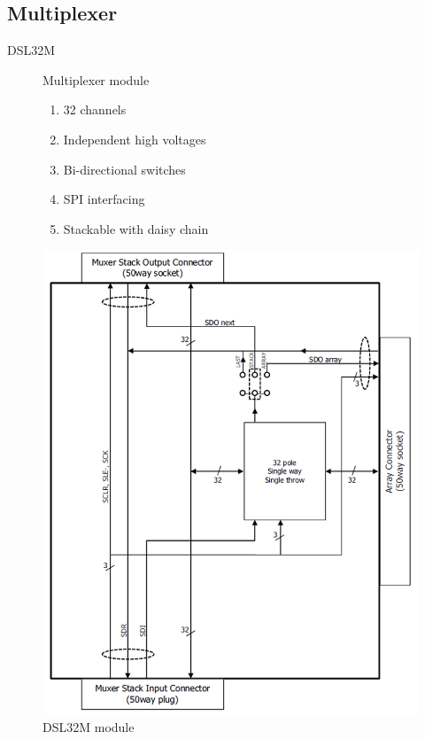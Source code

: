 \documentclass[t,12pt,english
\ifx\beamermode\undefined\else,\beamermode\fi
]{beamer}
\begin{document}
\subsection{Multiplexer}
\begin{frame}{DSL32M}



\begin{figure}[!htb]

\begin{block}{\footnotesize{Multiplexer module}}\footnotesize{}
\begin{enumerate} 
\vspace{0.05cm}
     \item \footnotesize{32 channels}
     \item \footnotesize{Independent high voltages}
     \item \footnotesize{Bi-directional switches}
     \item \footnotesize{SPI interfacing}
     \item \footnotesize{Stackable with daisy chain}
\end{enumerate}
\end{block}

\endminipage
{}
\centering
\includegraphics[width=.85\textwidth]{9.png}
\caption{\tiny{DSL32M module}}
\endminipage
\end{figure}

\end{frame}
\end{document}
